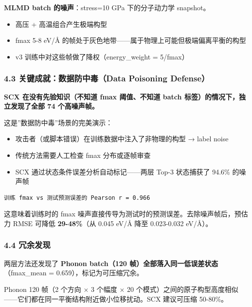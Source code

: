 \documentclass[
  12pt,
]{ctexart}
\providecommand{\tightlist}{%
  \setlength{\itemsep}{0pt}\setlength{\parskip}{0pt}}
\begin{document}
\textbf{MLMD batch 的噪声}：stress=10 GPa 下的分子动力学 snapshot。

\begin{itemize}
\tightlist
\item
  高压 + 高温组合产生极端构型
\item
  fmax 5-8 eV/Å 的帧处于灰色地带------属于物理上可能但极端偏离平衡的构型
\item
  v3 训练中对这些帧做了降权（energy\_weight = 5/fmax）
\end{itemize}

\subsubsection{4.3 关键成就：数据防中毒（Data Poisoning
Defense）}\label{ux5173ux952eux6210ux5c31ux6570ux636eux9632ux4e2dux6bd2data-poisoning-defense}

\textbf{SCX 在没有先验知识（不知道 fmax 阈值、不知道 batch
标签）的情况下，独立发现了全部 74 个高噪声帧。}

这是''数据防中毒''场景的完美演示：

\begin{itemize}
\tightlist
\item
  攻击者（或脚本错误）在训练数据中注入了非物理的构型 → label noise
\item
  传统方法需要人工检查 fmax 分布或逐帧审查
\item
  SCX 通过状态条件误差分析自动标记------两层 Top-3 状态捕获了 94.6\%
  的噪声帧
\end{itemize}

\begin{verbatim}
训练 fmax vs 测试预测误差的 Pearson r = 0.966
\end{verbatim}

这意味着训练时的 fmax
噪声直接传导为测试时的预测误差。去除噪声帧后，预估力 RMSE 可降低
\textbf{29-48\%}（从 0.045 eV/Å 降至 0.023-0.032 eV/Å）。

\subsubsection{4.4 冗余发现}\label{ux5197ux4f59ux53d1ux73b0}

两层方法还发现了 \textbf{Phonon batch（120
帧）全部落入同一低误差状态}（fmax\_mean = 0.659），标记为可压缩冗余。

Phonon 120 帧（2 个方向 × 3 个幅度 × 20
个模式）之间的原子构型高度相似------它们都在同一平衡结构附近做小位移扰动。SCX
建议可压缩 50-80\%。
\end{document}
